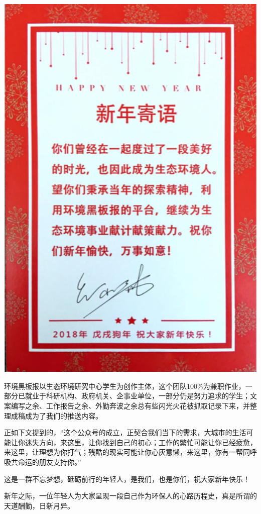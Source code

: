 \documentclass[]{book}
\begin{document}
\includegraphics[width=5.74in]{images/2018}

环境黑板报以生态环境研究中心学生为创作主体，这个团队100\%为兼职作业，一部分已就业于科研机构、政府机关、企事业单位，一部分仍是努力追求的学生；文案编写之余、工作报告之余、外勤奔波之余总有些闪光火花被抓取记录下来，并整理成稿成为了我们的推送内容。

正如下文提到的，``这个公众号的成立，正契合我们当下的需求，大城市的生活可能让你迷失方向，来这里，让你找到自己的初心；工作的繁忙可能让你已经疲惫，来这里，让理想为你打气；残酷的现实可能让你心灰意懒，来这里，你有一帮同呼吸共命运的朋友支持你。''

这是一群不忘梦想，砥砺前行的年轻人，是我们，也是你们，祝大家新年快乐！

新年之际，一位年轻人为大家呈现一段自己作为环保人的心路历程史，真是所谓的天道酬勤，日新月异。
\end{document}
